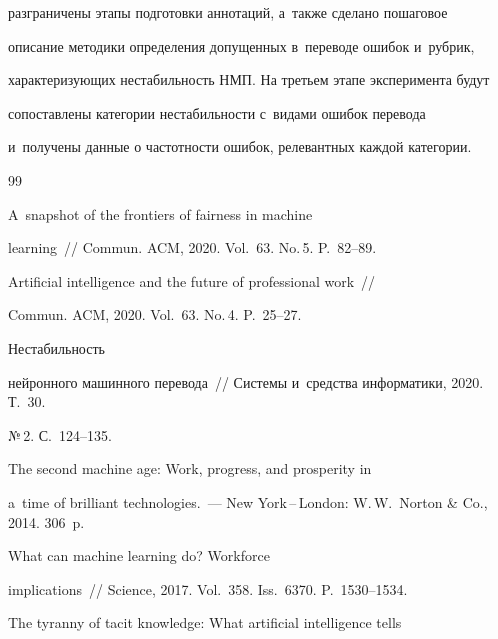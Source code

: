 разграничены этапы подготовки аннотаций, а~также сделано пошаговое 


описание методики определения допущенных в~переводе ошибок и~рубрик, 


характеризующих нестабильность НМП. На третьем этапе эксперимента будут 


сопоставлены категории нестабильности с~видами ошибок перевода 


и~получены данные о частотности ошибок, релевантных каждой категории.





{\small\frenchspacing


{%




\begin{thebibliography}{99}




 A~snapshot of the frontiers of fairness in machine 


learning~/\!\!/ Commun. ACM, 2020. Vol.~63. No.\,5. P.~82--89.




 Artificial intelligence and the future of professional work~/\!\!/ 


Commun. ACM, 2020. Vol.~63. No.\,4. P.~25--27.




 Нестабильность 


нейронного машинного перевода~/\!\!/ Системы и~средства информатики, 2020. Т.~30. 


№\,2. С.~124--135.




 The second machine age: Work, progress, and prosperity in 


a~time of brilliant technologies.~--- New York\,--\,London: W.\,W.~Norton \& Co., 2014. 306~p.




 What can machine learning do? Workforce 


implications~/\!\!/ Science, 2017. Vol.~358. Iss.~6370. P.~1530--1534.




 The tyranny of tacit knowledge: What artificial intelligence tells 



\end{thebibliography}}}
